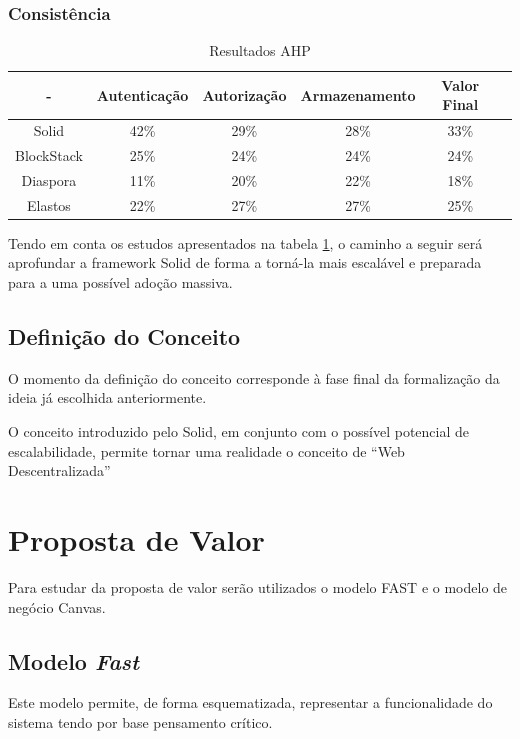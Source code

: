 \newpara

\subsubsection{Consistência}

\begin{table}[h]
\centering
\caption{Resultados AHP}
\label{tabela_resultados_ahp}
\vspace{0.5cm}
\begin{tabular}{c|c|c|c|c|c} 
 - & Autenticação & Autorização & Armazenamento & Valor Final & \\
\hline                               
Solid & 42\% &	29\% & 28\%	& 33\% & \\
BlockStack &  25\% & 24\% & 24\% & 24\% & \\
Diaspora &  11\% &	20\% & 22\% & 18\% & \\
Elastos & 22\% & 27\% & 27\% & 25\% & \\
\end{tabular}
\end{table}


Tendo em conta os estudos apresentados na tabela \ref{tabela_resultados_ahp}, o caminho a seguir será aprofundar a framework Solid de forma a torná-la mais escalável e preparada para a uma possível adoção massiva.

\subsection{Definição do Conceito}
O momento da definição do conceito corresponde à fase final da formalização da ideia já escolhida anteriormente.

O conceito introduzido pelo Solid, em conjunto com o possível potencial de escalabilidade, permite tornar uma realidade o conceito de “Web Descentralizada”

\section{Proposta de Valor}
Para estudar da proposta de valor serão utilizados o modelo FAST e o modelo de negócio Canvas.

\subsection{Modelo \emph{Fast}}
Este modelo permite, de forma esquematizada, representar a funcionalidade do sistema tendo por base pensamento crítico.

